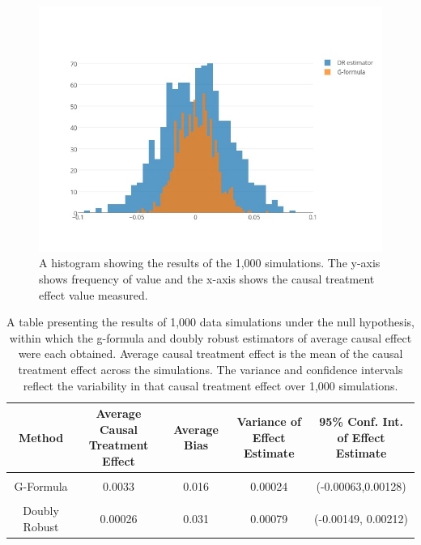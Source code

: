 \begin{figure}[h!]
\includegraphics[width = \linewidth]{figures/overlaid_histogram.jpeg}
\caption{A histogram showing the results of the 1,000 simulations.  The y-axis shows frequency of value and the x-axis shows the causal treatment effect value measured.}
\label{bighistogram}
\end{figure} 

\begin{table}[h!]
\centering
\begin{tabular}{c | c c c c }
Method & \shortstack{Average Causal \\ Treatment Effect} & Average Bias & \shortstack{Variance of \\ Effect Estimate} & \shortstack{95\% Conf. Int.\\ of Effect Estimate} \\ 
\hline \\
G-Formula & 0.0033 & 0.016 & 0.00024&(-0.00063,0.00128)\\ \\ 
Doubly Robust & 0.00026 & 0.031& 0.00079 & (-0.00149, 0.00212)
\end{tabular} \\
\centering
\caption{A table presenting the results of 1,000 data simulations under the null hypothesis, within which the g-formula and doubly robust estimators of average causal effect were each obtained.  Average causal treatment effect is the mean of the causal treatment effect across the simulations.  The variance and confidence intervals reflect the variability in that causal treatment effect over 1,000 simulations. \label{simdata}}
\end{table}


